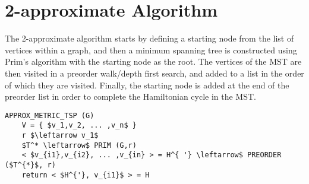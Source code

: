\section{2-approximate Algorithm}\label{2-approximate}
The 2-approximate algorithm starts by defining a starting node from the list of vertices within a graph, and then a minimum spanning tree is constructed using Prim's algorithm with the starting node as the root. The vertices of the MST are then visited in a preorder walk/depth first search, and added to a list in the order of which they are visited. Finally, the starting node is added at the end of the preorder list in order to complete the Hamiltonian cycle in the MST. 

\begin{lstlisting}[mathescape=true]
APPROX_METRIC_TSP (G)
    V = { $v_1,v_2, ... ,v_n$ } 
    r $\leftarrow v_1$
    $T^* \leftarrow$ PRIM (G,r)
    < $v_{i1},v_{i2}, ... ,v_{in} > = H^{ '} \leftarrow$ PREORDER ($T^{*}$, r) 
    return < $H^{'}, v_{i1}$ > = H
    
\end{lstlisting}

